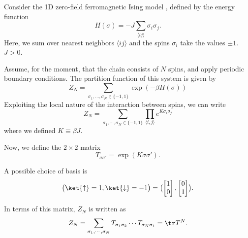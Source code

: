 
Consider the 1D zero-field ferromagnetic Ising model \cite{ising1925beitrag}, defined by the energy function
\begin{equation}\label{ising_energy_function}
  H(\sigma) = -J \sum_{\langle i j \rangle} \sigma_i \sigma_j.
\end{equation}
Here, we sum over nearest neighbors $\langle i j \rangle$ and the spins
$\sigma_i$ take the values $\pm 1$. $J > 0$.

Assume, for the moment, that the chain
consists of $N$ spins, and apply periodic boundary conditions.
The partition function of this system is given by
\begin{equation}
  Z_{N} = \sum_{\sigma_1, \dotsc, \sigma_N \in \{-1, 1\}} \exp (-\beta H(\sigma))
\end{equation}
Exploiting the local nature of the interaction between spins, we can write
\begin{equation}
  Z_{N} = \sum_{\sigma_1, \cdots, \sigma_N \in \{-1, 1\}} \prod_{\langle i, j \rangle} e^{K\sigma_i \sigma_j}
\end{equation}
where we defined $K \equiv \beta J$.

Now, we define the $2 \times 2$ matrix
\begin{equation}\label{eq:transfer_matrix_1d_ising}
  T_{\sigma \sigma'} = \exp(K \sigma \sigma').
\end{equation}

A possible
choice of basis is
\begin{equation}\label{eq:basis_transfer_matrix_1d}
  \bigl( \ket{\uparrow} = 1, \ket{\downarrow} = -1 \bigr) =
  \bigl(
  \begin{bmatrix}
    1 \\
    0
  \end{bmatrix},
  \begin{bmatrix}
    0 \\
    1
  \end{bmatrix}
  \bigr).
\end{equation}

In terms of this matrix, $Z_N$ is written as
\begin{equation}\label{eq:partition_function_transfer_matrix_1d}
  Z_N = \sum_{\sigma_1, \cdots, \sigma_N} T_{\sigma_1 \sigma_2} \dotsm T_{\sigma_N \sigma_1} = \tr T^N.
\end{equation}


